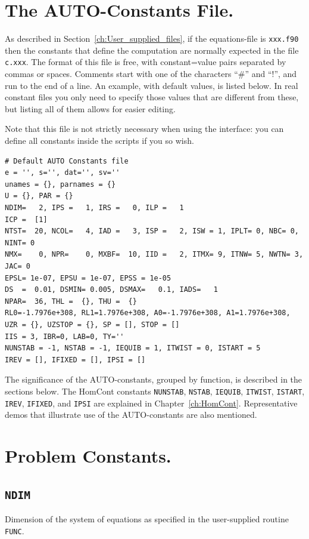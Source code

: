 \documentclass[12pt]{report}
\begin{document}
\section{ The {\cal AUTO}-Constants File.} \label{sec:The_AUTO_constants_file}
As described in Section~\ref{ch:User_supplied_files}, 
if the equations-file is {\tt xxx.f90} 
then the constants that define the computation 
are normally expected in the file  {\tt c.xxx}.
The format of this file is free, with constant=value pairs separated
by commas or spaces. Comments start with one of the characters  ``\#''
and ``!'', and run to the end of a line.
An example, with default values, is listed below. In real constant
files you only need to specify those values that are different from
these, but listing all of them allows for easier editing.

Note that this file is not strictly necessary when using the \python
interface: you can define all constants inside the scripts if you so wish.

\begin{verbatim}
# Default AUTO Constants file
e = '', s='', dat='', sv=''
unames = {}, parnames = {}
U = {}, PAR = {}
NDIM=   2, IPS =   1, IRS =   0, ILP =   1
ICP =  [1]
NTST=  20, NCOL=   4, IAD =   3, ISP =   2, ISW = 1, IPLT= 0, NBC= 0, NINT= 0
NMX=    0, NPR=    0, MXBF=  10, IID =   2, ITMX= 9, ITNW= 5, NWTN= 3, JAC= 0
EPSL= 1e-07, EPSU = 1e-07, EPSS = 1e-05
DS  =  0.01, DSMIN= 0.005, DSMAX=   0.1, IADS=   1
NPAR=  36, THL =  {}, THU =  {}
RL0=-1.7976e+308, RL1=1.7976e+308, A0=-1.7976e+308, A1=1.7976e+308,
UZR = {}, UZSTOP = {}, SP = [], STOP = []
IIS = 3, IBR=0, LAB=0, TY=''
NUNSTAB = -1, NSTAB = -1, IEQUIB = 1, ITWIST = 0, ISTART = 5
IREV = [], IFIXED = [], IPSI = []
\end{verbatim}

The significance of the {\cal AUTO}-constants, grouped by function, is 
described in the sections below. The HomCont constants \texttt{NUNSTAB},
\texttt{NSTAB}, \texttt{IEQUIB}, \texttt{ITWIST}, \texttt{ISTART},
\texttt{IREV}, \texttt{IFIXED}, and \texttt{IPSI} are explained in
Chapter~\ref{ch:HomCont}.
Representative demos that illustrate use of the {\cal AUTO}-constants
are also mentioned.

\section{ Problem Constants.} \label{sec:Problem_constants}
\subsection{\texttt{NDIM}} \label{sec:NDIM}
 Dimension of the system of equations as specified in the user-supplied
 routine {\tt FUNC}.
\end{document}

